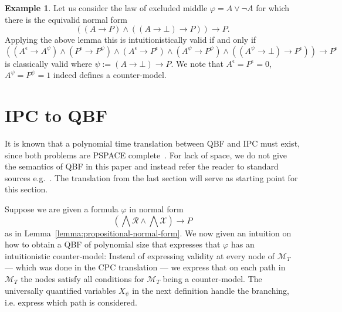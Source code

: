 \documentclass{easychair}
\theoremstyle{definition}
\theoremstyle{definition}
\theoremstyle{definition}
\theoremstyle{definition}
\theoremstyle{definition}
\theoremstyle{definition}
\newtheorem{example}[theorem]{Example}
\theoremstyle{definition}
\begin{document}
\begin{example}
	Let us consider the law of excluded middle $\varphi = A\vee\neg A$ for which there is the equivalid normal form
	$$((A\to P)\wedge ((A\to \bot)\to P))\to P.$$
	Applying the above lemma this is intuitionistically valid if and only if $$((A^\epsilon\to A^\psi)\wedge(P^\epsilon\to P^\psi)\wedge(A^\epsilon\to P^\epsilon)\wedge(A^\psi\to P^\psi)\wedge ((A^\psi\to \bot)\to P^\epsilon))\to P^\epsilon$$ is classically valid where $\psi := (A\to \bot)\to P$.
	We note that $A^\epsilon  = P^\epsilon = 0$, $A^\psi = P^{\psi}  = 1$ indeed defines a counter-model.
\end{example}	

\section{IPC to QBF}\label{sec:qbf}

It is known that a polynomial time translation between QBF and IPC must exist, since both problems are PSPACE complete~\cite{garey1979computers,statman1979intuitionistic}.
For lack of space, we do not give the semantics of QBF in this paper and instead refer the reader to standard sources e.g.~\cite{series/faia/2009-185}.
The translation from the last section will serve as starting point for this section.

Suppose we are given a formula $\varphi$ in normal form $$\left(\bigwedge\mathcal R\wedge\bigwedge\mathcal X\right)\to P$$ as in Lemma~\ref{lemma:propositional-normal-form}. We now given an intuition on how to obtain a QBF of polynomial size that expresses that $\varphi$ has an intuitionistic counter-model:
Instead of expressing validity at every node of $\mathcal M_T$ --- which was done in the CPC translation --- we express that on each path in $\mathcal M_T$ the nodes satisfy all conditions for $\mathcal M_T$ being a counter-model.
The universally quantified variables $X_\psi$ in the next definition handle the branching, i.e. express which path is considered.
\end{document}
